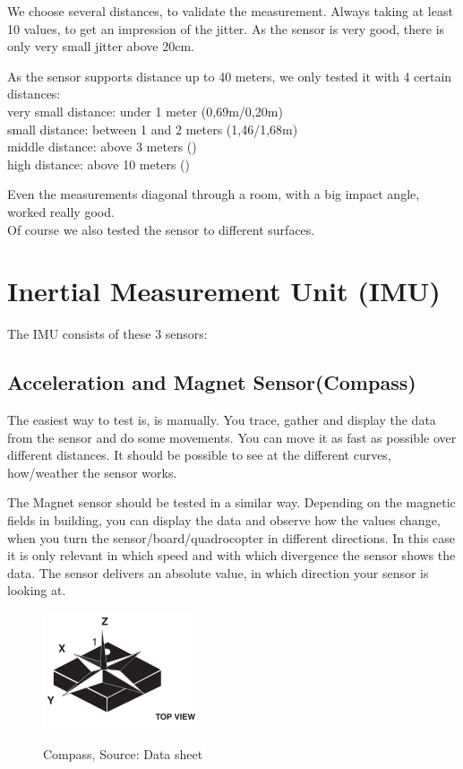 We choose several distances, to validate the measurement. Always taking at least 10 values, to get an impression of the jitter. As the sensor is very good, there is only very small jitter above 20cm.

As the sensor supports distance up to 40 meters, we only tested it with 4 certain distances:\\
very small distance: under 1 meter (0,69m/0,20m)\\
small distance: between 1 and 2 meters (1,46/1,68m)\\
middle distance: above 3 meters ()\\
high distance: above 10 meters ()

Even the measurements diagonal through a room, with a big impact angle, worked really good.\\
Of course we also tested the sensor to different surfaces.


\section{Inertial Measurement Unit (IMU)}

The IMU consists of these 3 sensors:

\subsection{Acceleration and Magnet Sensor(Compass)}

The easiest way to test is, is manually. You trace, gather and display the data from the sensor and do some movements. You can move it as fast as possible over different distances. It should be possible to see at the different curves, how/weather the sensor works.

The Magnet sensor should be tested in a similar way. Depending on the magnetic fields in building, you can display the data and observe how the values change, when you turn the sensor/board/quadrocopter in different directions. In this case it is only relevant in which speed and with which divergence the sensor shows the data. The sensor delivers an absolute value, in which direction your sensor is looking at.


\begin{figure}[H]
	\centering
		\includegraphics{fig/ch-sensor_testing_concept/compass.png}%
	\label{fig:IMU_com}
	\caption{Compass, Source: Data sheet}
\end{figure}


